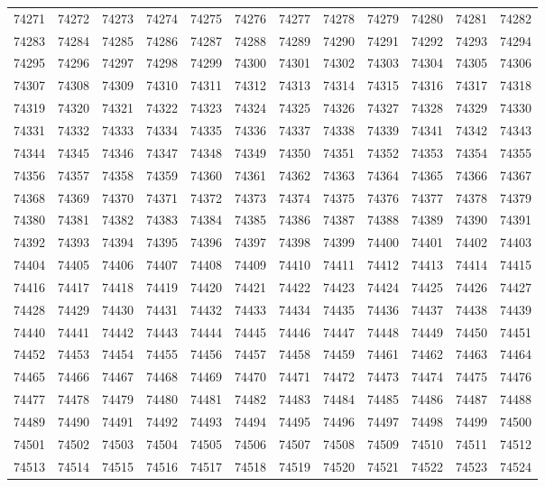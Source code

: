 \begin{center}
\begin{longtable}{llllllllllll}
74271 &74272 &74273 &74274 &74275 &74276 &74277 &74278 &74279 &74280 &74281 &74282 \\
74283 &74284 &74285 &74286 &74287 &74288 &74289 &74290 &74291 &74292 &74293 &74294 \\
74295 &74296 &74297 &74298 &74299 &74300 &74301 &74302 &74303 &74304 &74305 &74306 \\
74307 &74308 &74309 &74310 &74311 &74312 &74313 &74314 &74315 &74316 &74317 &74318 \\
74319 &74320 &74321 &74322 &74323 &74324 &74325 &74326 &74327 &74328 &74329 &74330 \\
74331 &74332 &74333 &74334 &74335 &74336 &74337 &74338 &74339 &74341 &74342 &74343 \\
74344 &74345 &74346 &74347 &74348 &74349 &74350 &74351 &74352 &74353 &74354 &74355 \\
74356 &74357 &74358 &74359 &74360 &74361 &74362 &74363 &74364 &74365 &74366 &74367 \\
74368 &74369 &74370 &74371 &74372 &74373 &74374 &74375 &74376 &74377 &74378 &74379 \\
74380 &74381 &74382 &74383 &74384 &74385 &74386 &74387 &74388 &74389 &74390 &74391 \\
74392 &74393 &74394 &74395 &74396 &74397 &74398 &74399 &74400 &74401 &74402 &74403 \\
74404 &74405 &74406 &74407 &74408 &74409 &74410 &74411 &74412 &74413 &74414 &74415 \\
74416 &74417 &74418 &74419 &74420 &74421 &74422 &74423 &74424 &74425 &74426 &74427 \\
74428 &74429 &74430 &74431 &74432 &74433 &74434 &74435 &74436 &74437 &74438 &74439 \\
74440 &74441 &74442 &74443 &74444 &74445 &74446 &74447 &74448 &74449 &74450 &74451 \\
74452 &74453 &74454 &74455 &74456 &74457 &74458 &74459 &74461 &74462 &74463 &74464 \\
74465 &74466 &74467 &74468 &74469 &74470 &74471 &74472 &74473 &74474 &74475 &74476 \\
74477 &74478 &74479 &74480 &74481 &74482 &74483 &74484 &74485 &74486 &74487 &74488 \\
74489 &74490 &74491 &74492 &74493 &74494 &74495 &74496 &74497 &74498 &74499 &74500 \\
74501 &74502 &74503 &74504 &74505 &74506 &74507 &74508 &74509 &74510 &74511 &74512 \\
74513 &74514 &74515 &74516 &74517 &74518 &74519 &74520 &74521 &74522 &74523 &74524 \\

\end{longtable}
\end{center}
